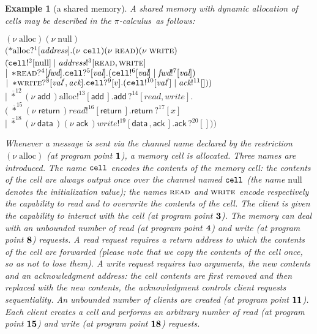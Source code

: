 \documentclass{article}
\newtheorem{example}[thm]{Example}
\newcommand{\picalcul}{$\pi$-calculus}
\newcommand{\concu}{|}
\newcommand{\nuu}{\nu\;}
\newcommand{\repli}{\ast}
\newcommand{\rec}{?}
\newcommand{\eme}{!}
\newcommand{\pp}[1]{$\bf{#1}$}
\newcommand{\pps}[1]{(at program point \pp{#1})}
\newcommand{\bang}[1]{\overline{\repli}^{#1}}
\newcommand{\globalname}[1]{\mathrm{#1}}
\newcommand{\internal}[1]{\textnormal{\texttt{#1}}}
\newcommand{\capability}[1]{\textsc{#1}}
\newcommand{\data}[1]{\textsf{#1}\,}
\newcommand{\variable}[1]{\textit{#1}}
\newcommand{\cack}{\variable{ack}}
\newcommand{\cdata}{\data{data}}
\newcommand{\addinit}{\data{add}}
\newcommand{\addread}{\data{return}}
\newcommand{\addwrite}{\data{ack}}
\newcommand{\port}{\variable{fwd}}
\newcommand{\ccreate}{\globalname{alloc}}
\newcommand{\cnull}{\globalname{null}}
\newcommand{\ccell}{\internal{cell}}
\newcommand{\cread}{\capability{read}}
\newcommand{\cwrite}{\capability{write}}
\newcommand{\datawrite}{\variable{val}'}
\newcommand{\dataread}{\variable{val}}
\newcommand{\memlaba}{1}
\newcommand{\memlabb}{2}
\newcommand{\memlabc}{3}
\newcommand{\memlabd}{4}
\newcommand{\memlabe}{5}
\newcommand{\memlabf}{6}
\newcommand{\memlabg}{7}
\newcommand{\memlabh}{8}
\newcommand{\memlabi}{9}
\newcommand{\memlabj}{10}
\newcommand{\memlabk}{11}
\newcommand{\memlabl}{12}
\newcommand{\memlabm}{13}
\newcommand{\memlabn}{14}
\newcommand{\memlabo}{15}
\newcommand{\memlabp}{16}
\newcommand{\memlabq}{17}
\newcommand{\memlabr}{18}
\newcommand{\memlabs}{19}
\newcommand{\memlabt}{20}
\begin{document}
{
\begin{example}[a shared memory]
\label{memory}
A shared memory with dynamic allocation of cells may be described  
in the \picalcul\ as follows:
\begin{tabbing}
$(\nuu\ccreate)(\nuu\cnull)$\\
$($\;$\repli$\=$\ccreate\rec^{\memlaba}[\textit{address}].(\nuu \ccell)(\nuu \cread)(\nuu \cwrite)$\\
\>$($\=\;$\ccell\eme^{\memlabb}[\cnull]\;\concu\; \textit{address}\eme^{\memlabc}[\cread,\cwrite]\;$\\
\>$\concu\; \repli\!\cread\rec^{\memlabd}[\port].\ccell\rec^{\memlabe}[\dataread].(\ccell\eme^{\memlabf}[\dataread]\;\concu\;\port\eme^{\memlabg}[\dataread])$\\
\>$\concu\;\repli\!\cwrite\rec^{\memlabh}[\datawrite,\cack].\ccell\rec^{\memlabi}[v].(\ccell\eme^{\memlabj}[\datawrite]\;\concu\;\cack\eme^{\memlabk}[]))$\\
$\concu\;\bang{\memlabl} (\nuu\addinit)$$\ccreate\eme^{\memlabm}[\addinit].\addinit\rec^{\memlabn}[\textit{read},\textit{write}].$\\
\>$(\;\bang{\memlabo} (\nuu \addread)\textit{read}\eme^{\memlabp}[\addread].\addread\rec^{\memlabq}[x]$\\
\>$\concu\;\bang{\memlabr} (\nuu \cdata)(\nuu \addwrite)\textit{write}\eme^{\memlabs}[\cdata,\addwrite].\addwrite\rec^{\memlabt}[]))$
\end{tabbing}
Whenever a message is sent via the channel name declared by the restriction $(\nuu \ccreate)$ \pps{\memlaba}, a memory cell is allocated.
Three names are introduced. The name $\ccell$ encodes the contents of the memory cell: the contents of the cell are always output once over the channel named $\ccell$ (the name $\cnull$ denotes the initialization value); the names $\cread$ and $\cwrite$ encode respectively the capability to read and to overwrite the contents of the cell. 
The client is given the capability to interact with the cell \pps{\memlabc}.
The memory can deal with an unbounded number of read \pps{\memlabd} and write \pps{\memlabh} requests. 
A read request requires a return address to which the contents of the cell are forwarded (please note that we copy the contents of the cell once, so as not to lose them). 
A write request requires two arguments, the new contents and an acknowledgment address: the cell contents  are first removed and then replaced with  the new contents, the acknowledgment controls client requests sequentiality. 
An unbounded number of clients are created \pps{\memlabk}.
Each client creates a cell and performs an arbitrary number of read \pps{\memlabo} and write \pps{\memlabr} requests.


\end{example}}
\end{document}
